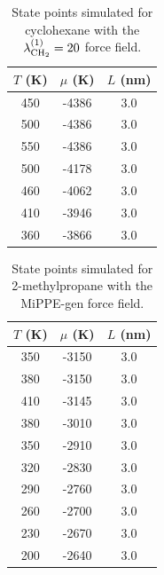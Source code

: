\documentclass[journal=jctc,manuscript=article]{achemso}
\begin{document}
\begin{table}[htb!]
	\caption{State points simulated for cyclohexane with the $\lambda^{(1)}_{\rm CH_2} = 20$ force field.}
	\begin{center}
		\begin{tabular}{|c|c|c|}
			\hline
			$T$ (K) & $\mu$ (K) & $L$ (nm) \\ \hline
			450	&	-4386	&	3.0	\\
			500	&	-4386	&	3.0	\\
			550	&	-4386	&	3.0	\\
			500	&	-4178	&	3.0	\\
			460	&	-4062	&	3.0	\\
			410	&	-3946	&	3.0	\\
			360	&	-3866	&	3.0	\\
			\hline
		\end{tabular}
	\end{center}
\end{table}

\begin{table}[htb!]
	\caption{State points simulated for 2-methylpropane with the MiPPE-gen force field.}
	\begin{center}
		\begin{tabular}{|c|c|c|}
			\hline
			$T$ (K) & $\mu$ (K) & $L$ (nm) \\ \hline
            350	&	-3150	&	3.0	\\
            380	&	-3150	&	3.0	\\
            410	&	-3145	&	3.0	\\
            380	&	-3010	&	3.0	\\
            350	&	-2910	&	3.0	\\
            320	&	-2830	&	3.0	\\
            290	&	-2760	&	3.0	\\
            260	&	-2700	&	3.0	\\
            230	&	-2670	&	3.0	\\
            200	&	-2640	&	3.0	\\
            \hline
		\end{tabular}
	\end{center}
\end{table}
\end{document}
